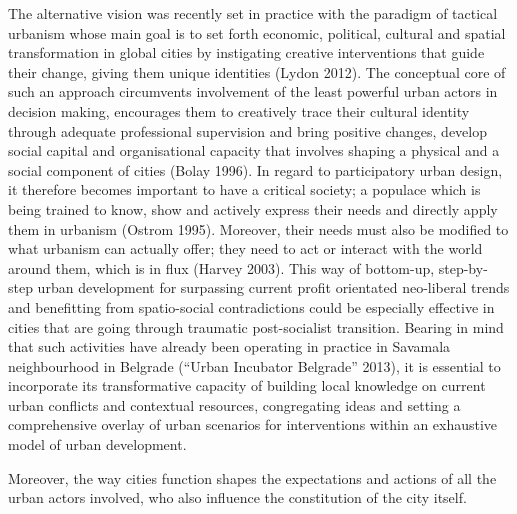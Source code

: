\documentclass[11pt]{report}
\begin{document}
The alternative vision was recently set in practice with the paradigm of tactical urbanism whose main goal is to set forth economic, political, cultural and spatial transformation in global cities by instigating creative interventions that guide their change, giving them unique identities (Lydon 2012). The conceptual core of such an approach circumvents involvement of the least powerful urban actors in decision making, encourages them to creatively trace their cultural identity through adequate professional supervision and bring positive changes, develop social capital and organisational capacity that involves shaping a physical and a social component of cities (Bolay 1996). In regard to participatory urban design, it therefore becomes important to have a critical society; a populace which is being trained to know, show and actively express their needs and directly apply them in urbanism (Ostrom 1995). Moreover, their needs must also be modified to what urbanism can actually offer; they need to act or interact with the world around them, which is in flux (Harvey 2003).
This way of bottom-up, step-by-step urban development for surpassing current profit orientated neo-liberal trends and benefitting from spatio-social contradictions could be especially effective in cities that are going through traumatic post-socialist transition. Bearing in mind that such activities have already been operating in practice in Savamala neighbourhood in Belgrade (“Urban Incubator Belgrade” 2013), it is essential to incorporate its transformative capacity of building local knowledge on current urban conflicts and contextual resources, congregating ideas and setting a comprehensive overlay of urban scenarios for interventions within an exhaustive model of urban development.

Moreover, the way cities function shapes the expectations and actions of all the urban actors involved, who also influence the constitution of the city itself.
\end{document}
